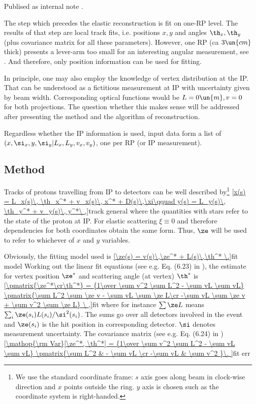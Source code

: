 Publised as internal note .

The step which precedes the elastic reconstruction is fit on one-RP level. The results of that step are local track fits, i.e. positions $x, y$ and angles $\th_x, \th_y$ (plus covariance matrix for all these parameters). However, one RP (ca $3\un{cm}$ thick) presents a lever-arm too small for an interesting angular measurement, see . And therefore, only position information can be used for fitting.

In principle, one may also employ the knowledge of vertex distribution at the IP. That can be understood as a fictitious measurement at IP with uncertainty given by beam width. Corresponding optical functions would be $L = 0\un{m}, v = 0$ for both projections. The question whether this makes sense will be addressed after presenting the method and the algorithm of reconstruction.

Regardless whether the IP information is used, input data form a list of $(x, \si_x, y, \si_y|\penalty0 L_x, L_y, v_x, v_y)$, one per RP (or IP measurement).




\subsection[method]{Method}
Tracks of protons travelling from IP to detectors can be well described by\footnote{We use the standard coordinate frame: $s$ axis goes along beam in clock-wise direction and $x$ points outside the ring. $y$ axis is chosen such as the coordinate system is right-handed.}
\eqref{x(s) = L_x(s)\, \th_x^* + v_x(s)\, x^* + D(s)\,\xi\qquad y(s) = L_y(s)\, \th_y^* + v_y(s)\, y^*\ ,}{track general}
where the quantities with stars refer to the state of the proton at IP. For elastic scattering $\xi\equiv 0$ and therefore dependencies for both coordinates obtain the same form. Thus, $\ze$ will be used to refer to whichever of $x$ and $y$ variables.

Obviously, the fitting model used is
\eqref{\ze(s) = v(s)\,\ze^* + L(s)\,\th^* \.}{fit model}
Working out the linear fit equations (see e.g. Eq. (6.23) in ), the estimate for vertex position $\ze^*$ and scattering angle (at vertex) $\th^*$ is
\eqref{\pmatrix{\ze^*\cr\th^*} = {1\over \sum v^2 \sum L^2 - \sum vL \sum vL} \pmatrix{\sum L^2 \sum \ze v - \sum vL \sum \ze L\cr -\sum vL \sum \ze v + \sum v^2 \sum \ze L} \ ,}{fit}
where for instance $\sum \ze L$ means $\sum_{i} \ze(s_i) L(s_i) / \si^2(s_i)$. The sums go over all detectors involved in the event and $\ze(s_i)$ is the hit position in corresponding detector. $\si$ denotes measurement uncertainty. The covariance matrix (see e.g. Eq. (6.24) in )
\eqref{\mathop{\rm Var}[\ze^*, \th^*] = {1\over \sum v^2 \sum L^2 - \sum vL \sum vL} \pmatrix{\sum L^2 & - \sum vL \cr -\sum vL & \sum v^2 }\.
}{fit err}

